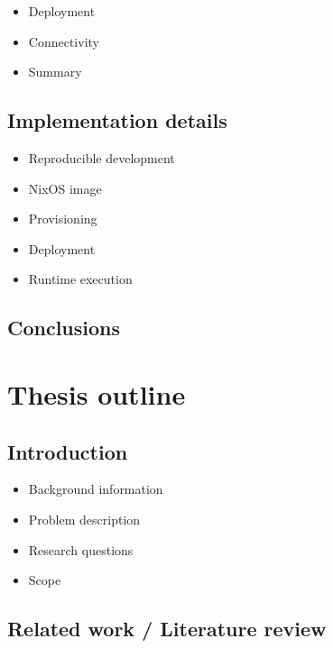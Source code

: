 \begin{itemize}
\tightlist
\item
  Deployment
\item
  Connectivity
\item
  Summary
\end{itemize}

\hypertarget{implementation-details}{%
\section{Implementation details}\label{implementation-details}}

\begin{itemize}
\tightlist
\item
  Reproducible development
\item
  NixOS image
\item
  Provisioning
\item
  Deployment
\item
  Runtime execution
\end{itemize}

\hypertarget{conclusions}{%
\section{Conclusions}\label{conclusions}}

\hypertarget{thesis-outline}{%
\chapter{Thesis outline}\label{thesis-outline}}

\hypertarget{introduction}{%
\section{Introduction}\label{introduction}}

\begin{itemize}
\tightlist
\item
  Background information
\item
  Problem description
\item
  Research questions
\item
  Scope
\end{itemize}

\hypertarget{related-work-literature-review}{%
\section{Related work / Literature
review}\label{related-work-literature-review}}

